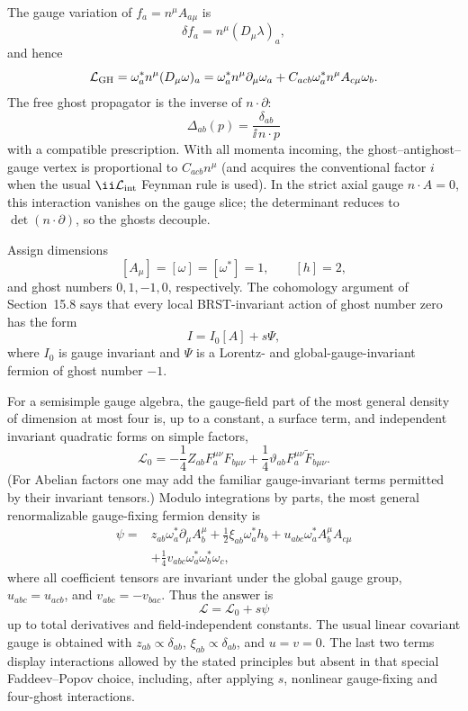 \begin{enumerate}
  The gauge variation of \(f_a=n^\mu A_{a\mu}\) is
  \[
    \delta f_a=n^\mu(D_\mu\lambda)_a,
  \]
  and hence
  \[
    \mathcal L_{\rm GH}
      =\omega_a^*n^\mu(D_\mu\omega)_a
      =\omega_a^*n^\mu\partial_\mu\omega_a
       +C_{acb}
        \omega_a^*n^\mu A_{c\mu}\omega_b .
  \]
  The free ghost propagator is the inverse of \(n\cdot\partial\):
  \[
    \Delta_{ab}(p)
      =\frac{\delta_{ab}}{\ii\,n\cdot p}
  \]
  with a compatible prescription.  With all momenta incoming, the
  ghost--antighost--gauge vertex is proportional to
  \(C_{acb}n^\mu\) (and acquires the conventional factor \(i\)
  when the usual \(\ii\mathcal L_{\rm int}\) Feynman rule is used).  In the
  strict axial gauge \(n\cdot A=0\), this interaction vanishes on the gauge
  slice; the determinant reduces to \(\det(n\cdot\partial)\), so the ghosts
  decouple.

  Assign dimensions
  \[
    [A_\mu]=[\omega]=[\omega^*]=1,\qquad [h]=2,
  \]
  and ghost numbers \(0,1,-1,0\), respectively.  The cohomology argument of
  Section~15.8 says that every local BRST-invariant action of ghost number
  zero has the form
  \[
    I=I_0[A]+s\Psi ,
  \]
  where \(I_0\) is gauge invariant and \(\Psi\) is a Lorentz- and
  global-gauge-invariant fermion of ghost number \(-1\).

  For a semisimple gauge algebra, the gauge-field part of the most general
  density of dimension at most four is, up to a constant, a surface term,
  and independent invariant quadratic forms on simple factors,
  \[
    \mathcal L_0
      =-\frac14 Z_{ab}
        F_a^{\mu\nu}F_{b\mu\nu}
       +\frac14\vartheta_{ab}
        F_a^{\mu\nu}\widetilde F_{b\mu\nu}.
  \]
  (For Abelian factors one may add the familiar gauge-invariant terms
  permitted by their invariant tensors.)  Modulo integrations by parts, the
  most general renormalizable gauge-fixing fermion density is
  \[
    \begin{split}
    \psi={}&
      z_{ab}\omega_a^*\partial_\mu A_b^\mu
      +\frac12\xi_{ab}\omega_a^*h_b
      +u_{abc}
       \omega_a^*A_b^\mu A_{c\mu}\\
      &+\frac14 v_{abc}
       \omega_a^*\omega_b^*\omega_c ,
    \end{split}
  \]
  where all coefficient tensors are invariant under the global gauge group,
  \(u_{abc}=u_{acb}\), and
  \(v_{abc}=-v_{bac}\).  Thus the answer is
  \[
    \boxed{\mathcal L=\mathcal L_0+s\psi}
  \]
  up to total derivatives and field-independent constants.  The usual
  linear covariant gauge is obtained with \(z_{ab}\propto
  \delta_{ab}\), \(\xi_{ab}\propto\delta_{ab}\),
  and \(u=v=0\).  The last two terms display interactions allowed by the
  stated principles but absent in that special Faddeev--Popov choice,
  including, after applying \(s\), nonlinear gauge-fixing and four-ghost
  interactions.


\end{enumerate}
